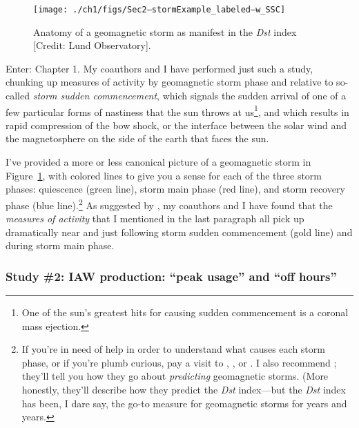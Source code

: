
\begin{figure}
  \centering
  \noindent\texttt{[image: ./ch1/figs/Sec2--stormExample\_labeled--w\_SSC]}
  \caption[Anatomy of a geomagnetic storm \`{a} la \textit{Dst}]{Anatomy of a
    geomagnetic storm as manifest in the \textit{Dst} index [Credit: Lund
    Observatory].}
  \label{ch1:fDstStorm}
\end{figure}


Enter: Chapter 1. My coauthors and I have performed just such a study, chunking
up measures of \Alfic activity by geomagnetic storm phase and relative to
so-called \emph{storm sudden commencement}, which signals the sudden arrival of
one of a few particular forms of nastiness that the sun throws at
us\footnote{One of the sun's greatest hits for causing sudden commencement is a
  coronal mass ejection.}, and which results in rapid compression of the bow
shock, or the interface between the solar wind and the magnetosphere on the side
of the earth that faces the sun.

I've provided a more or less canonical picture of a geomagnetic storm in
Figure~\ref{ch1:fDstStorm}, with colored lines to give you a sense for each of
the three storm phases: quiescence (green line), storm main phase (red line),
and storm recovery phase (blue line).\footnote{If you're in need of help in
  order to understand what causes each storm phase, or if you're plumb curious,
  pay a visit to \citet{Gonzalez1994}, \citet{Denton2006}, or
  \citet{Lakhina2008}. I also recommend \citet{Lundstedt2002}; they'll tell you
  how they go about \emph{predicting} geomagnetic storms. (More honestly,
  they'll describe how they predict the \textit{Dst} index---but the
  \textit{Dst} index has been, I dare say, the go-to measure for geomagnetic
  storms for years and years.} As suggested by \citet{Chaston2007}, my coauthors
and I have found that the \emph{measures of \Alfic activity} that I mentioned in
the last paragraph all pick up dramatically near and just following storm sudden
commencement (gold line) and during storm main phase.

\subsubsection{Study \#2: IAW production: ``peak usage'' and ``off hours''}

